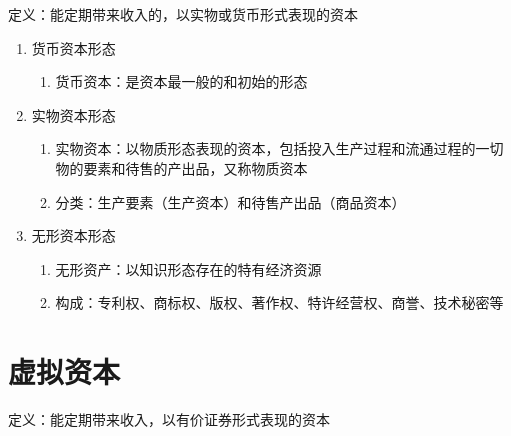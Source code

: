 \documentclass[12pt]{book}
\begin{document}
定义：能定期带来收入的，以实物或货币形式表现的资本
\\

\begin{enumerate}[1.]
    \item 货币资本形态
          \begin{enumerate}[(1)]
              \item 货币资本：是资本最一般的和初始的形态
          \end{enumerate}
    \item 实物资本形态
          \begin{enumerate}[(1)]
              \item 实物资本：以物质形态表现的资本，包括投入生产过程和流通过程的一切物的要素和待售的产出品，又称物质资本
              \item 分类：生产要素（生产资本）和待售产出品（商品资本）
          \end{enumerate}
    \item 无形资本形态
          \begin{enumerate}[(1)]
              \item 无形资产：以知识形态存在的特有经济资源
              \item 构成：专利权、商标权、版权、著作权、特许经营权、商誉、技术秘密等
          \end{enumerate}

\end{enumerate}



\section{虚拟资本}

定义：能定期带来收入，以有价证券形式表现的资本
\\
\end{document}
